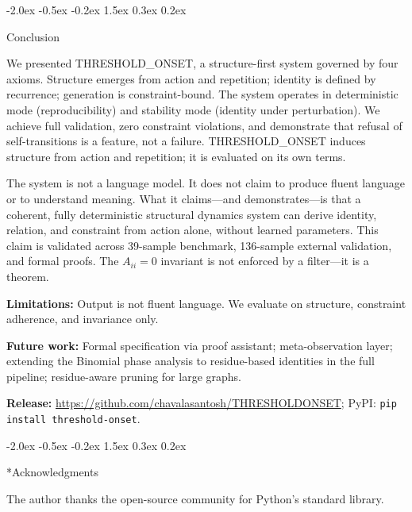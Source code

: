 \documentclass[10pt]{article}
\makeatletter
\renewcommand{\section}{\@startsection{section}{1}{\z@}%
  {-2.0ex \@plus -0.5ex \@minus -0.2ex}%
  {1.5ex \@plus 0.3ex \@minus 0.2ex}%
  {\large\bfseries\raggedright}}
\makeatother
\begin{document}
\section{Conclusion}
\label{sec:conclusion}

We presented THRESHOLD\_ONSET, a structure-first system governed by four axioms.
Structure emerges from action and repetition; identity is defined by recurrence;
generation is constraint-bound. The system operates in deterministic mode
(reproducibility) and stability mode (identity under perturbation). We achieve full
validation, zero constraint violations, and demonstrate that refusal of self-transitions
is a feature, not a failure. THRESHOLD\_ONSET induces structure from action and
repetition; it is evaluated on its own terms.

The system is not a language model. It does not claim to produce fluent language or
to understand meaning. What it claims---and demonstrates---is that a coherent,
fully deterministic structural dynamics system can derive identity, relation, and
constraint from action alone, without learned parameters. This claim is validated
across 39-sample benchmark, 136-sample external validation, and formal proofs. The
$A_{ii} = 0$ invariant is not enforced by a filter---it is a theorem.

\textbf{Limitations:} Output is not fluent language. We evaluate on structure,
constraint adherence, and invariance only.

\textbf{Future work:} Formal specification via proof assistant; meta-observation layer;
extending the Binomial phase analysis to residue-based identities in the full pipeline;
residue-aware pruning for large graphs.

\textbf{Release:} \url{https://github.com/chavalasantosh/THRESHOLDONSET};
PyPI: \texttt{pip install threshold-onset}.

\section*{Acknowledgments}

The author thanks the open-source community for Python's standard library.



\end{document}
